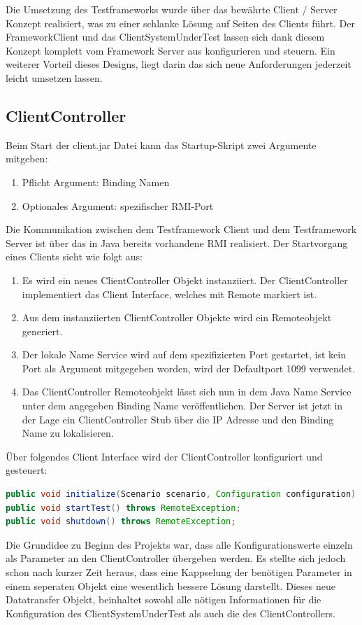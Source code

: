 Die Umsetzung des Testframeworks wurde über das bewährte Client / Server Konzept realisiert, was zu einer schlanke Lösung auf Seiten des Clients führt. Der FrameworkClient und das ClientSystemUnderTest lassen sich dank die\-sem Konzept komplett vom Framework Server aus konfigurieren und steuern. Ein weiterer Vorteil dieses Designs, liegt darin das sich neue Anforderungen jederzeit leicht umsetzen lassen.


\subsection{ClientController}
\label{sec:clientController}
 
Beim Start der client.jar Datei kann das Startup-Skript zwei Argumente mitgeben:
\begin{enumerate}
\item Pflicht Argument: Binding Namen
\item Optionales Argument: spezifischer RMI-Port
\end{enumerate}
Die Kommunikation zwischen dem Testframework Client und dem Testframework Server ist über das in Java bereits vorhandene RMI realisiert. Der Startvorgang eines Clients sieht wie folgt aus:
\begin{enumerate}
\item Es wird ein neues ClientController Objekt instanziiert. Der ClientController implementiert das Client Interface, welches mit Remote markiert ist.
\item Aus dem instanziierten ClientController Objekte wird ein Remoteobjekt generiert.
\item Der lokale Name Service wird auf dem spezifizierten Port gestartet, ist kein Port als Argument mitgegeben worden, wird der Defaultport 1099 verwendet.
\item Das ClientController Remoteobjekt lässt sich nun in dem Java Name Service unter dem angegeben Binding Name veröffentlichen. Der Server ist jetzt in der Lage ein ClientController Stub über die IP Adresse und den Binding Name zu lokalisieren.
\end{enumerate}

Über folgendes Client Interface wird der ClientController konfiguriert und gesteuert:
\begin{lstlisting}[language=java, breaklines=true] 	
public void initialize(Scenario scenario, Configuration configuration) throws RemoteException;
public void startTest() throws RemoteException;
public void shutdown() throws RemoteException;
\end{lstlisting}
Die Grundidee zu Beginn des Projekts war, dass alle Konfigurationswerte einzeln als Parameter an den ClientController übergeben werden. Es stellte sich je\-doch schon nach kurzer Zeit her\-aus, dass eine Kap\-pse\-lung der be\-nötigen Para\-meter in einem seperaten Objekt eine wesentlich bessere Lösung darstellt. Dieses neue Datatransfer Objekt, beinhaltet sowohl alle nötigen Informationen für die Konfiguration des ClientSystemUnderTest als auch die des ClientControllers.

